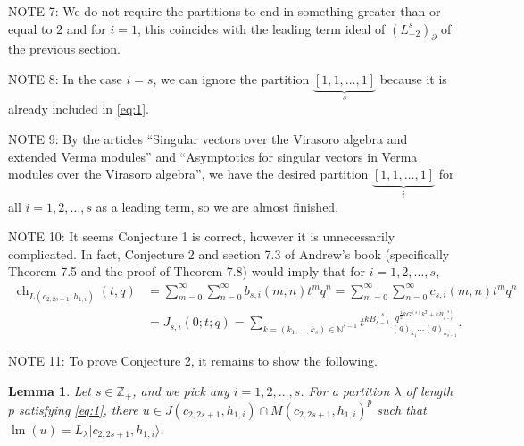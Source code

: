 \documentclass[a4paper, 12pt, reqno]{amsart}
\newtheorem{lemma}[theorem]{Lemma}
\DeclareMathOperator{\ch}{ch}
\DeclareMathOperator{\lm}{lm}
\begin{document}
NOTE 7: We do not require the partitions to end in something greater than or equal to $2$ and for $i = 1$, this coincides with the leading term ideal of $(L_{-2}^s)_{\partial}$ of the previous section.

NOTE 8: In the case $i = s$, we can ignore the partition $\underbrace{[1, 1, \dots, 1]}_s$ because it is already included in \eqref{eq:1}.

NOTE 9: By the articles ``Singular vectors over the Virasoro algebra and extended Verma modules'' and ``Asymptotics for singular vectors in Verma
modules over the Virasoro algebra'', we have the desired partition $\underbrace{[1, 1, \dots, 1]}_i$ for all $i = 1, 2, \dots, s$ as a leading term, so we are almost finished.

NOTE 10: It seems Conjecture 1 is correct, however it is unnecessarily complicated.
In fact, Conjecture 2 and section 7.3 of Andrew's book (specifically Theorem 7.5 and the proof of Theorem 7.8) would imply that for $i = 1, 2, \dots, s$,
\begin{align*}
  \ch_{L(c_{2, 2s + 1}, h_{1, i})}(t, q) &= \sum_{m = 0}^{\infty}\sum_{n = 0}^{\infty}b_{s, i}(m, n)t^mq^n = \sum_{m = 0}^{\infty}\sum_{n = 0}^{\infty}c_{s, i}(m, n)t^mq^n \\
                                         &= J_{s, i}(0; t; q) = \sum_{k = (k_1, \dots, k_s) \in \mathbb{N}^{s - 1}}t^{kB^{(s)}_{s - 1}}\frac{q^{\frac{1}{2}kG^{(s)}k^T + kB^{(s)}_{s - i}}}{(q)_{k_1}\dots(q)_{k_{s - 1}}}.
\end{align*}

NOTE 11: To prove Conjecture 2, it remains to show the following.
\begin{lemma}
  \label{lmm:1}
  Let $s \in \mathbb{Z}_+$, and we pick any $i = 1, 2, \dots, s$.
  For a partition $\lambda$ of length $p$ satisfying \eqref{eq:1}, there $u \in J(c_{2, 2s + 1}, h_{1, i}) \cap M(c_{2, 2s + 1}, h_{1, i})^p$ such that $\lm(u) = L_{\lambda}|c_{2, 2s + 1}, h_{1, i}\rangle$.
\end{lemma}
\end{document}
